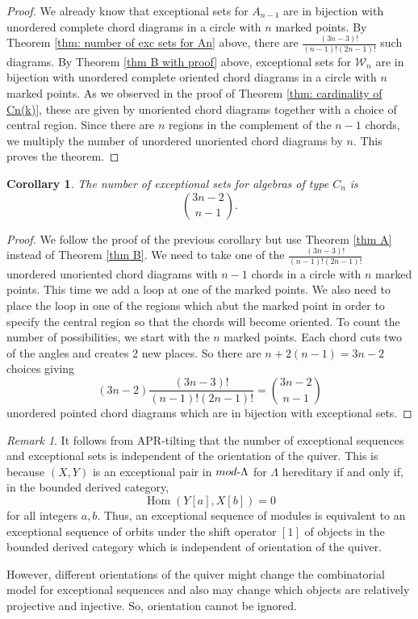\documentclass[11pt]{amsart}
\newtheorem{cor}[thm]{Corollary}
\theoremstyle{definition}
\theoremstyle{remark}
\newtheorem{rem}[thm]{Remark}
\numberwithin{equation}{section}
\DeclareMathOperator{\Hom}{Hom}%
\newcommand{\cW}{\ensuremath{{\mathcal{W}}}}
\begin{document}
\begin{proof} We already know that exceptional sets for $A_{n-1}$ are in bijection with unordered complete chord diagrams in a circle with $n$ marked points. By Theorem \ref{thm: number of exc sets for An} above, there are $\frac{(3n-3)!}{(n-1)!(2n-1)!}$ such diagrams. By Theorem \ref{thm B with proof} above, exceptional sets for $\cW_n$ are in bijection with unordered complete oriented chord diagrams in a circle with $n$ marked points. As we observed in the proof of Theorem \ref{thm: cardinality of Cn(k)}, these are given by unoriented chord diagrams together with a choice of central region. Since there are $n$ regions in the complement of the $n-1$ chords, we multiply the number of unordered unoriented chord diagrams by $n$. This proves the theorem.
\end{proof}

\begin{cor}\label{cor: exc sets of Cn}
The number of exceptional sets for algebras of type $C_n$ is
\[
	\binom{3n-2}{n-1}.
\]
\end{cor}

\begin{proof}
We follow the proof of the previous corollary but use Theorem \ref{thm A} instead of Theorem \ref{thm B}. We need to take one of the $\frac{(3n-3)!}{(n-1)!(2n-1)!}$ unordered unoriented chord diagrams with $n-1$ chords in a circle with $n$ marked points. This time we add a loop at one of the marked points. We also need to place the loop in one of the regions which abut the marked point in order to specify the central region so that the chords will become oriented. To count the number of possibilities, we start with the $n$ marked points. Each chord cuts two of the angles and creates 2 new places. So there are $n+2(n-1)=3n-2$ choices giving%
\[
	(3n-2)\frac{(3n-3)!}{(n-1)!(2n-1)!}=\binom{3n-2}{n-1}
\]
unordered pointed chord diagrams which are in bijection with exceptional sets.
\end{proof}

\begin{rem}\label{rem: about APR and orientation}
It follows from APR-tilting \cite{APR} that the number of exceptional sequences and exceptional sets is independent of the orientation of the quiver. This is because $(X,Y)$ is an exceptional pair in $mod\text-\Lambda$ for $\Lambda$ hereditary if and only if, in the bounded derived category,
\[
	\Hom(Y[a],X[b])=0
\]
for all integers $a,b$. Thus, an exceptional sequence of modules is equivalent to an exceptional sequence of orbits under the shift operator $[1]$ of objects in the bounded derived category which is independent of orientation of the quiver.

However, different orientations of the quiver might change the combinatorial model for exceptional sequences and also may change which objects are relatively projective and injective. So, orientation cannot be ignored.
\end{rem}
\end{document}
